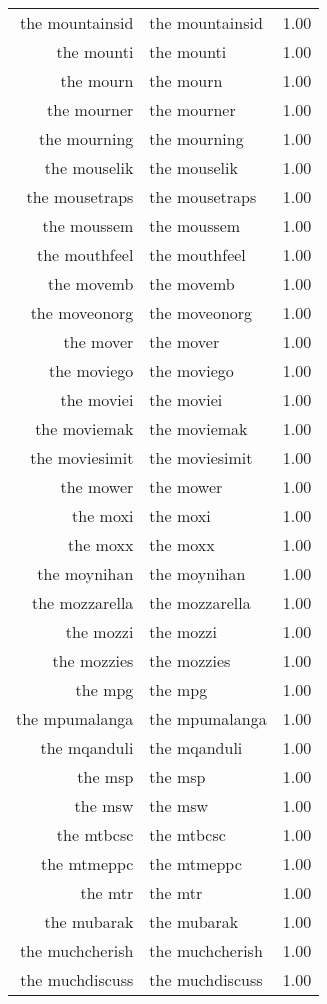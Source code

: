 \begin{table}[ht]
\begin{tabular}{rlr}
  the mountainsid & the mountainsid & 1.00 \\ 
  the mounti & the mounti & 1.00 \\ 
  the mourn & the mourn & 1.00 \\ 
  the mourner & the mourner & 1.00 \\ 
  the mourning & the mourning & 1.00 \\ 
  the mouselik & the mouselik & 1.00 \\ 
  the mousetraps & the mousetraps & 1.00 \\ 
  the moussem & the moussem & 1.00 \\ 
  the mouthfeel & the mouthfeel & 1.00 \\ 
  the movemb & the movemb & 1.00 \\ 
  the moveonorg & the moveonorg & 1.00 \\ 
  the mover & the mover & 1.00 \\ 
  the moviego & the moviego & 1.00 \\ 
  the moviei & the moviei & 1.00 \\ 
  the moviemak & the moviemak & 1.00 \\ 
  the moviesimit & the moviesimit & 1.00 \\ 
  the mower & the mower & 1.00 \\ 
  the moxi & the moxi & 1.00 \\ 
  the moxx & the moxx & 1.00 \\ 
  the moynihan & the moynihan & 1.00 \\ 
  the mozzarella & the mozzarella & 1.00 \\ 
  the mozzi & the mozzi & 1.00 \\ 
  the mozzies & the mozzies & 1.00 \\ 
  the mpg & the mpg & 1.00 \\ 
  the mpumalanga & the mpumalanga & 1.00 \\ 
  the mqanduli & the mqanduli & 1.00 \\ 
  the msp & the msp & 1.00 \\ 
  the msw & the msw & 1.00 \\ 
  the mtbcsc & the mtbcsc & 1.00 \\ 
  the mtmeppc & the mtmeppc & 1.00 \\ 
  the mtr & the mtr & 1.00 \\ 
  the mubarak & the mubarak & 1.00 \\ 
  the muchcherish & the muchcherish & 1.00 \\ 
  the muchdiscuss & the muchdiscuss & 1.00 \\ 

\end{tabular}
\end{table}
